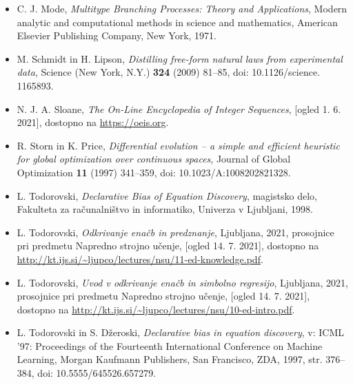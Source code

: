 \documentclass[t,usenames,dvipsnames]{beamer} %
\newcommand{\1}{\boldsymbol{1}}
\newcommand{\0}{\boldsymbol{0}}
\begin{document}
\begin{frame}
\begin{itemize}
    \item C. J. Mode, \textit{Multitype Branching Processes: Theory and Applications}, Modern analytic and computational methods in science and mathematics, American Elsevier Publishing Company, New York, 1971.
    \item M. Schmidt in H. Lipson, \textit{Distilling free-form natural laws from experimental data}, Science (New York, N.Y.) \textbf{324} (2009) 81–85, doi: 10.1126/science.  1165893.
    \item N. J. A. Sloane, \textit{The On-Line Encyclopedia of Integer Sequences}, [ogled 1. 6.  2021], dostopno na \url{https://oeis.org}.
    \item R. Storn in K. Price, \textit{Differential evolution – a simple and efficient heuristic for global optimization over continuous spaces}, Journal of Global Optimization \textbf{11} (1997) 341–359, doi: 10.1023/A:1008202821328.
    \item L. Todorovski, \textit{Declarative Bias of Equation Discovery}, magistsko delo, Fakulteta za računalništvo in informatiko, Univerza v Ljubljani, 1998.
\end{itemize}
\end{frame}

\begin{frame}
\begin{itemize}
    \item L. Todorovski, \textit{Odkrivanje enačb in predznanje}, Ljubljana, 2021, prosojnice pri predmetu Napredno strojno učenje, [ogled 14. 7. 2021], dostopno na \url{http://kt.ijs.si/~ljupco/lectures/nsu/11-ed-knowledge.pdf}.
    \item L. Todorovski, \textit{Uvod v odkrivanje enačb in simbolno regresijo}, Ljubljana, 2021, prosojnice pri predmetu Napredno strojno učenje, [ogled 14. 7. 2021], dostopno na \url{http://kt.ijs.si/~ljupco/lectures/nsu/10-ed-intro.pdf}.
\item L. Todorovski in S. Džeroski, \textit{Declarative bias in equation discovery}, v: ICML ’97: Proceedings of the Fourteenth International Conference on Machine Learning, Morgan Kaufmann Publishers, San Francisco, ZDA, 1997, str. 376–384, doi: 10.5555/645526.657279.

\end{itemize}
\end{frame}
\end{document}

